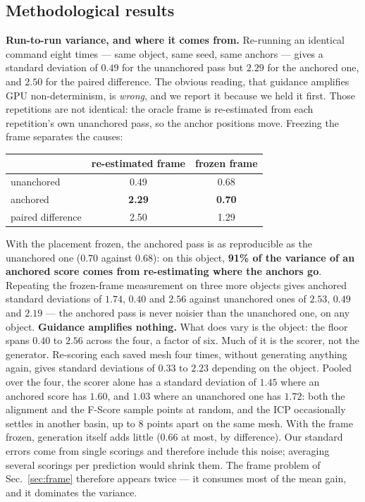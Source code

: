 \documentclass[conference]{IEEEtran}
\begin{document}
\subsection{Methodological results}
\label{sec:methodology}

\textbf{Run-to-run variance, and where it comes from.} Re-running an identical command
eight times --- same object, same seed, same anchors --- gives a standard deviation of
$0.49$ for the unanchored pass but $2.29$ for the anchored one, and $2.50$ for the
paired difference. The obvious reading, that guidance amplifies GPU non-determinism, is
\emph{wrong}, and we report it because we held it first. Those repetitions are not
identical: the oracle frame is re-estimated from each repetition's own unanchored pass,
so the anchor positions move. Freezing the frame separates the causes:

\begin{center}\small
\begin{tabular}{lcc}
\toprule
& re-estimated frame & frozen frame \\
\midrule
unanchored & 0.49 & 0.68 \\
anchored & \textbf{2.29} & \textbf{0.70} \\
paired difference & 2.50 & 1.29 \\
\bottomrule
\end{tabular}
\end{center}

With the placement frozen, the anchored pass is as reproducible as the unanchored one
($0.70$ against $0.68$): on this object, \textbf{91\% of the variance of an anchored
score comes from re-estimating where the anchors go}. Repeating the frozen-frame
measurement on three more objects gives anchored standard deviations of $1.74$, $0.40$
and $2.56$ against unanchored ones of $2.53$, $0.49$ and $2.19$ --- the anchored pass is
never noisier than the unanchored one, on any object. \textbf{Guidance amplifies
nothing.} What does vary is the object: the floor spans $0.40$ to $2.56$ across the
four, a factor of six. Much of it is the scorer, not the generator.
Re-scoring each saved mesh four times, without generating anything again, gives
standard deviations of $0.33$ to $2.23$ depending on the object. Pooled over the four,
the scorer alone has a standard deviation of $1.45$ where an anchored score has $1.60$,
and $1.03$ where an unanchored one has $1.72$: both the alignment and the F-Score sample
points at random, and the ICP occasionally settles in another basin, up to $8$ points
apart on the same mesh. With the frame frozen, generation itself adds little ($0.66$
at most, by difference). Our standard errors come from single scorings and therefore
include this noise; averaging several scorings per prediction would shrink them.
The frame problem of Sec.~\ref{sec:frame} therefore appears twice --- it consumes most
of the mean gain, and it dominates the variance.
\end{document}
